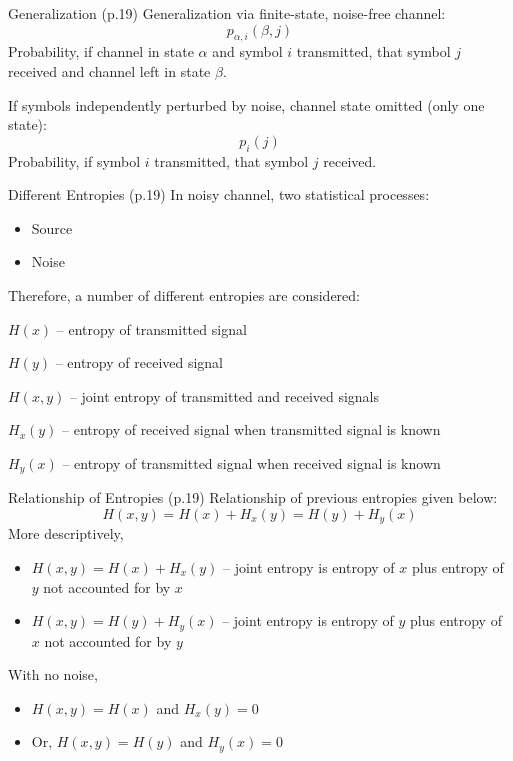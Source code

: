 \documentclass{beamer}
\begin{document}
  \begin{frame}{Generalization \small (p.19)}
    Generalization via finite-state, noise-free channel:
    \begin{equation}
    p_{\alpha,i}(\beta,j)
    \end{equation}
    Probability, if channel in state $\alpha$ and symbol $i$ transmitted, that
    symbol $j$ received and channel left in state $\beta$.

    If symbols independently perturbed by noise, channel state omitted (only
    one state):
    \begin{equation}
    p_{i}(j)
    \end{equation}
    Probability, if symbol $i$ transmitted, that symbol $j$ received.
  \end{frame}

  \begin{frame}{Different Entropies \small (p.19)}
    In noisy channel, two statistical processes:
    \begin{itemize}
      \item Source
      \item Noise
    \end{itemize}
    Therefore, a number of different entropies are considered:
    \begin{itemize}
      {\small
        \item $H(x)$ -- entropy of transmitted signal
        \item $H(y)$ -- entropy of received signal
        \item $H(x,y)$ -- joint entropy of transmitted and received signals
        \item $H_x(y)$ -- entropy of received signal when transmitted signal is known
        \item $H_y(x)$ -- entropy of transmitted signal when received signal is known
      }
    \end{itemize}
  \end{frame}

  \begin{frame}{Relationship of Entropies \small (p.19)}
    Relationship of previous entropies given below:
    \begin{equation}
      H(x,y) = H(x) + H_x(y) = H(y) + H_y(x)
    \end{equation}
    More descriptively,
    \begin{itemize}
      \item $H(x,y) = H(x) + H_x(y)$ -- joint entropy is entropy of $x$ plus
      entropy of $y$ not accounted for by $x$
      \item $H(x,y) = H(y) + H_y(x)$ -- joint entropy is entropy of $y$ plus
      entropy of $x$ not accounted for by $y$
    \end{itemize}
    With no noise,
    \begin{itemize}
      \item $H(x,y) = H(x)$ and $H_x(y) = 0$
      \item Or, $H(x,y) = H(y)$ and $H_y(x) = 0$
    \end{itemize}
  \end{frame}
\end{document}
